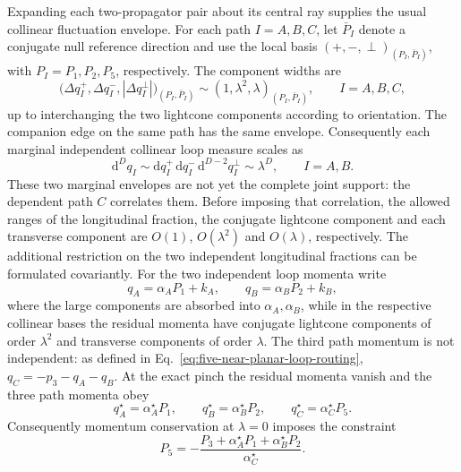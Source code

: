 \documentclass[a4paper,11pt]{article}
\newcommand{\dd}{\mathrm d}
\begin{document}
Expanding each two-propagator pair about its central ray supplies the usual
collinear fluctuation envelope.  For each path \(I=A,B,C\), let
\(\bar P_I\) denote a conjugate null reference direction and use the local
basis \((+,-,\perp)_{(P_I,\bar P_I)}\), with \(P_I=P_1,P_2,P_5\), respectively.
The component widths are
\begin{equation}
 \bigl(\Delta q_I^+,\Delta q_I^-,|\Delta q_I^\perp|\bigr)_{(P_I,\bar P_I)}
 \sim (1,\lambda^2,\lambda)_{(P_I,\bar P_I)},
 \qquad I=A,B,C,
 \label{eq:five-near-planar-collinear-modes}
\end{equation}
up to interchanging the two lightcone components according to orientation.
The companion edge on the same path has the same envelope.  Consequently
each marginal independent collinear loop measure scales as
\begin{equation}
 \dd^Dq_I
 \sim\dd q_I^+\,\dd q_I^-\,\dd^{D-2}q_I^\perp
 \sim\lambda^D,
\qquad I=A,B.
 \label{eq:five-near-planar-collinear-measures}
\end{equation}
These two marginal envelopes are not yet the complete joint support: the
dependent path \(C\) correlates them.  Before imposing that correlation, the allowed ranges of the
longitudinal fraction, the conjugate lightcone component and each transverse
component are \(O(1)\), \(O(\lambda^2)\) and \(O(\lambda)\), respectively.
The additional restriction on the two independent longitudinal fractions
can be formulated covariantly.  For the two independent loop momenta write
\begin{equation}
 q_A=\alpha_AP_1+k_A,
 \qquad
 q_B=\alpha_BP_2+k_B,
 \label{eq:five-near-planar-independent-loop-decomposition}
\end{equation}
where the large components are absorbed into \(\alpha_A,\alpha_B\), while in the
respective collinear bases the residual momenta have conjugate lightcone
components of order \(\lambda^2\) and transverse components of order
\(\lambda\).  The third path momentum is not independent: as defined in
Eq.~\eqref{eq:five-near-planar-loop-routing},
\(q_C=-p_3-q_A-q_B\).  At the exact pinch the residual momenta vanish and
the three path momenta obey
\[
 q_A^\star=\alpha_A^\star P_1,\qquad
 q_B^\star=\alpha_B^\star P_2,\qquad
 q_C^\star=\alpha_C^\star P_5.
\]
Consequently momentum conservation at \(\lambda=0\) imposes the constraint
\begin{equation}
 P_5=-\frac{P_3
 +\alpha_A^\star P_1+\alpha_B^\star P_2}
 {\alpha_C^\star}.
 \label{eq:five-near-planar-pinch-conservation}
\end{equation}
\end{document}
